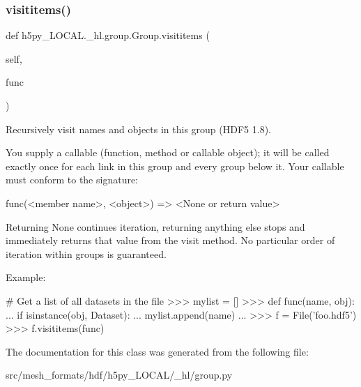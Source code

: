\subsubsection{\texorpdfstring{visititems()}{visititems()}}
{\footnotesize\ttfamily def h5py\+\_\+\+L\+O\+C\+A\+L.\+\_\+hl.\+group.\+Group.\+visititems (\begin{DoxyParamCaption}\item[{}]{self,  }\item[{}]{func }\end{DoxyParamCaption})}

\begin{DoxyVerb}Recursively visit names and objects in this group (HDF5 1.8).

You supply a callable (function, method or callable object); it
will be called exactly once for each link in this group and every
group below it. Your callable must conform to the signature:

    func(<member name>, <object>) => <None or return value>

Returning None continues iteration, returning anything else stops
and immediately returns that value from the visit method.  No
particular order of iteration within groups is guaranteed.

Example:

# Get a list of all datasets in the file
>>> mylist = []
>>> def func(name, obj):
...     if isinstance(obj, Dataset):
...         mylist.append(name)
...
>>> f = File('foo.hdf5')
>>> f.visititems(func)
\end{DoxyVerb}
 

The documentation for this class was generated from the following file\+:\begin{DoxyCompactItemize}
\item 
src/mesh\+\_\+formats/hdf/h5py\+\_\+\+L\+O\+C\+A\+L/\+\_\+hl/group.\+py\end{DoxyCompactItemize}

